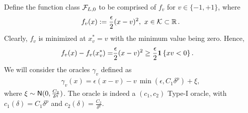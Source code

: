 Define the function class $\mathcal{F}_{L,0}$ to be comprised of $f_v$ for $v \in \{-1,+1\}$, where
\begin{align*}
  f_v(x) := \dfrac{\epsilon}{2} (x - v)^2, \,\, x \in \mathcal{K} \subset \mathbb{R}\,.
\end{align*}
Clearly, $f_v$ is minimized at $x^*_v = v$ with the minimum value being zero.
Hence,
\begin{align}
  f_v(x) - f_v(x^*_v)
  = &  \dfrac{\epsilon}{2} (x - v)^2 \ge  \dfrac{\epsilon}{2}  \mathbf{1}\left\{x v  < 0\right\}. \label{eq:main:fv-lb-main}
\end{align}
We will consider the oracles $\gamma_v$ defined as 
\begin{align}
 \gamma_v(x) = \epsilon(x-v) - v\, \min(\epsilon,C_1 \delta^p) + \xi, \label{eq:main:oracle-1d}
\end{align}
where $\xi \sim \mathsf{N}(0,\frac{C_2}{\delta^q})$.
The oracle is indeed a $(c_1,c_2)$ Type-I oracle, with $c_1(\delta)=C_1\delta^p$ and $c_2(\delta)=\frac{C_2}{\delta^q}$.

